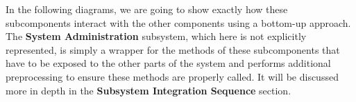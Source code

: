 In the following diagrams, we are going to show exactly how these subcomponents interact with the other components using a bottom-up approach. The \textbf{System Administration} subsystem, which here is not explicitly represented, is simply a wrapper for the methods of these subcomponents that have to be exposed to the other parts of the system and performs additional preprocessing to ensure these methods are properly called. It will be discussed more in depth in the \textbf{Subsystem Integration Sequence} section.
\begin{figure}[H]
\centering
{}
\end{figure}
\begin{figure}[H]
\centering
{}
\end{figure}
\begin{figure}[H]
\centering
{}
\end{figure}
\begin{figure}[H]
\centering
{}
\end{figure}
\begin{figure}[H]
\centering
{}
\end{figure}
